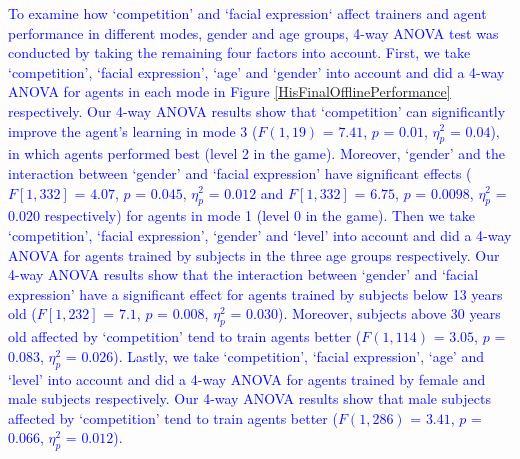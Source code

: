 \textcolor{blue}{To examine how `competition' and `facial expression` affect trainers and agent performance in different modes, gender and age groups, 4-way ANOVA test was conducted by taking the remaining four factors into account. First, %
we take `competition', `facial expression', `age' and `gender'  into account and did a 4-way ANOVA for agents in each mode in Figure \ref{HisFinalOfflinePerformance} respectively. %
Our 4-way ANOVA results show %
that `competition' can significantly improve the agent's learning in %
mode 3 ($F(1,19)$ = $7.41$, $p$ = $0.01$, $\eta_{p}^{2}$ = $0.04$),  %
in which agents performed best (level 2 in the game). Moreover, `gender' and the interaction between `gender' and `facial expression' have significant effects ($F[1,332]$ = $4.07$, $p$ = $0.045$, $\eta_{p}^{2}$ = $0.012$ and $F[1,332]$ = $6.75$, $p$ = $0.0098$, $\eta_{p}^{2}$ = $0.020$ respectively) for agents in mode 1 (level 0 in the game). }
\textcolor{blue}{Then we take `competition', `facial expression', `gender' and `level' into account and did a 4-way ANOVA for agents trained by subjects in the three age groups respectively. Our 4-way ANOVA results show that the interaction between `gender' and `facial expression' have a significant effect for agents trained by subjects below 13 years old ($F[1,232]$ = $7.1$, $p$ = $0.008$, $\eta_{p}^{2}$ = $0.030$). Moreover, subjects above 30 years old affected by `competition' tend to train agents better ($F(1,114)$ = $3.05$, $p$ = $0.083$, $\eta_{p}^{2}$ = $0.026$).
Lastly, we take `competition', `facial expression', `age' and `level' into account and did a 4-way ANOVA for agents trained by female and male subjects respectively. Our 4-way ANOVA results show that male subjects affected by `competition' tend to train agents better ($F(1,286)$ = $3.41$, $p$ = $0.066$, $\eta_{p}^{2}$ = $0.012$).
} 



